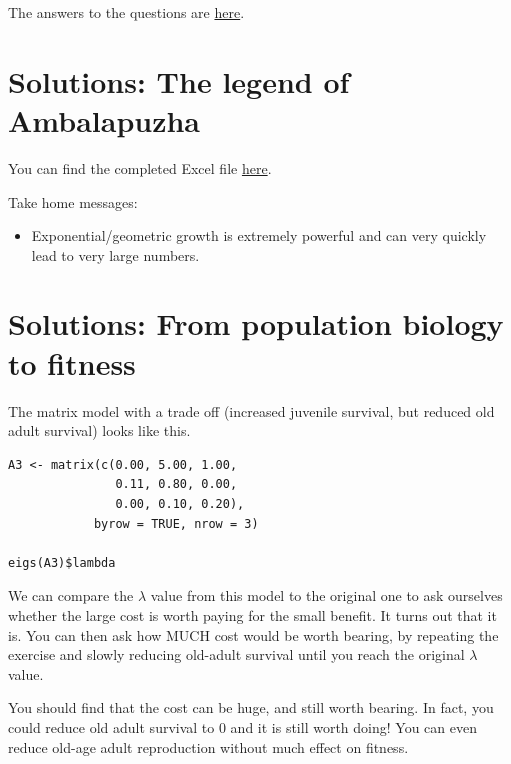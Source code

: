 \documentclass[
  a4paper]{book}
\providecommand{\tightlist}{%
  \setlength{\itemsep}{0pt}\setlength{\parskip}{0pt}}
\begin{document}
The answers to the questions are \href{https://www.dropbox.com/s/mt43nvqu7cjif69/10.\%20Answers\%20to\%20Pred-Prey\%20exercise.pdf?dl=1}{here}.

\hypertarget{solutions-the-legend-of-ambalapuzha}{%
\section{Solutions: The legend of Ambalapuzha}\label{solutions-the-legend-of-ambalapuzha}}

You can find the completed Excel file \href{https://www.dropbox.com/s/ybe5qhmfltuhoyv/RiceOnAChessboard_completed.xlsx?dl=1}{here}.

Take home messages:

\begin{itemize}
\tightlist
\item
  Exponential/geometric growth is extremely powerful and can very quickly lead to very large numbers.
\end{itemize}

\hypertarget{solutions-from-population-biology-to-fitness}{%
\section{Solutions: From population biology to fitness}\label{solutions-from-population-biology-to-fitness}}

The matrix model with a trade off (increased juvenile survival, but reduced old adult survival) looks like this.

\begin{verbatim}
A3 <- matrix(c(0.00, 5.00, 1.00, 
               0.11, 0.80, 0.00, 
               0.00, 0.10, 0.20), 
            byrow = TRUE, nrow = 3)

eigs(A3)$lambda
\end{verbatim}

We can compare the \(\lambda\) value from this model to the original one to ask ourselves whether the large cost is worth paying for the small benefit. It turns out that it is. You can then ask how MUCH cost would be worth bearing, by repeating the exercise and slowly reducing old-adult survival until you reach the original \(\lambda\) value.

You should find that the cost can be huge, and still worth bearing. In fact, you could reduce old adult survival to 0 and it is still worth doing! You can even reduce old-age adult reproduction without much effect on fitness.
\end{document}
